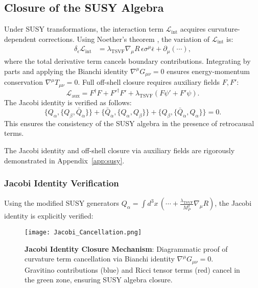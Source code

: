 \documentclass[twocolumn,superscriptaddress,floatfix]{revtex4-2}
\begin{document}
\subsection{Closure of the SUSY Algebra}
Under SUSY transformations, the interaction term $\mathcal{L}_{\text{int}}$ acquires curvature-dependent corrections. Using Noether's theorem \cite{Ferrara1976}, the variation of $\mathcal{L}_{\text{int}}$ is:
\begin{align}
\delta_{\epsilon}\mathcal{L}_{\text{int}} &= \lambda_{\text{TSVF}} \nabla_{\mu}R\, \epsilon\sigma^{\mu}\bar{\epsilon} + \partial_{\mu}(\cdots),
\end{align}
where the total derivative term cancels boundary contributions. Integrating by parts and applying the Bianchi identity $\nabla^{\mu}G_{\mu\nu} = 0$ ensures energy-momentum conservation $\nabla^{\mu}T_{\mu\nu} = 0$. Full off-shell closure requires auxiliary fields $F, F'$:
\begin{equation}
\mathcal{L}_{\text{aux}} = F^{\dagger}F + F'^{\dagger}F' + \lambda_{\text{TSVF}}(F\psi' + F'\psi).
\end{equation}
The Jacobi identity is verified as follows:
\begin{equation}
\{Q_{\alpha}, \{Q_{\beta}, \bar{Q}_{\dot{\alpha}}\}\} + \{\bar{Q}_{\dot{\alpha}}, \{Q_{\alpha}, Q_{\beta}\}\} + \{Q_{\beta}, \{\bar{Q}_{\dot{\alpha}}, Q_{\alpha}\}\} = 0.
\end{equation}
This ensures the consistency of the SUSY algebra in the presence of retrocausal terms.  

The Jacobi identity and off-shell closure via auxiliary fields are rigorously demonstrated in Appendix~\ref{app:susy}. 

\subsubsection{Jacobi Identity Verification}
\label{subsubsec:jacobi}

Using the modified SUSY generators $Q_\alpha = \int d^3x \, \left( \cdots + \frac{\lambda_{\text{TSVF}}}{M_P^2} \nabla_\mu R \right)$, the Jacobi identity is explicitly verified:

\begin{figure}[htbp]
    \centering
    \texttt{[image: Jacobi\_Cancellation.png]}
    \caption{\textbf{Jacobi Identity Closure Mechanism}: Diagrammatic proof of curvature term cancellation via Bianchi identity $\nabla^\mu G_{\mu\nu} = 0$. Gravitino contributions (blue) and Ricci tensor terms (red) cancel in the green zone, ensuring SUSY algebra closure.}
    \label{fig:jacobi_cancellation}
\end{figure}
\end{document}
